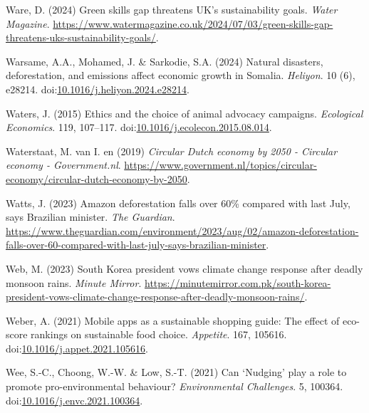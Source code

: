 \documentclass[
  letterpaper,
  DIV=11,
  numbers=noendperiod]{scrartcl}
\newlength{\cslhangindent}
\newenvironment{CSLReferences}[2] %
 {\begin{list}{}{%
  \setlength{\itemindent}{0pt}
  \setlength{\leftmargin}{0pt}
  \setlength{\parsep}{0pt}
  \ifodd #1
   \setlength{\leftmargin}{\cslhangindent}
   \setlength{\itemindent}{-1\cslhangindent}
  \fi
  \setlength{\itemsep}{#2\baselineskip}}}
 {\end{list}}
\begin{document}
\begin{CSLReferences}{0}{1}
Ware, D. (2024) Green skills gap threatens {UK}'s sustainability goals.
\emph{Water Magazine}.
\url{https://www.watermagazine.co.uk/2024/07/03/green-skills-gap-threatens-uks-sustainability-goals/}.

Warsame, A.A., Mohamed, J. \& Sarkodie, S.A. (2024) Natural disasters,
deforestation, and emissions affect economic growth in {Somalia}.
\emph{Heliyon}. 10 (6), e28214.
doi:\href{https://doi.org/10.1016/j.heliyon.2024.e28214}{10.1016/j.heliyon.2024.e28214}.

Waters, J. (2015) Ethics and the choice of animal advocacy campaigns.
\emph{Ecological Economics}. 119, 107--117.
doi:\href{https://doi.org/10.1016/j.ecolecon.2015.08.014}{10.1016/j.ecolecon.2015.08.014}.

Waterstaat, M. van I. en (2019) \emph{Circular {Dutch} economy by 2050 -
{Circular} economy - {Government}.nl}.
\url{https://www.government.nl/topics/circular-economy/circular-dutch-economy-by-2050}.

Watts, J. (2023) Amazon deforestation falls over 60\% compared with last
{July}, says {Brazilian} minister. \emph{The Guardian}.
\url{https://www.theguardian.com/environment/2023/aug/02/amazon-deforestation-falls-over-60-compared-with-last-july-says-brazilian-minister}.

Web, M. (2023) South {Korea} president vows climate change response
after deadly monsoon rains. \emph{Minute Mirror}.
\url{https://minutemirror.com.pk/south-korea-president-vows-climate-change-response-after-deadly-monsoon-rains/}.

Weber, A. (2021) Mobile apps as a sustainable shopping guide: {The}
effect of eco-score rankings on sustainable food choice.
\emph{Appetite}. 167, 105616.
doi:\href{https://doi.org/10.1016/j.appet.2021.105616}{10.1016/j.appet.2021.105616}.

Wee, S.-C., Choong, W.-W. \& Low, S.-T. (2021) Can {`{Nudging}'} play a
role to promote pro-environmental behaviour? \emph{Environmental
Challenges}. 5, 100364.
doi:\href{https://doi.org/10.1016/j.envc.2021.100364}{10.1016/j.envc.2021.100364}.


\end{CSLReferences}
\end{document}
